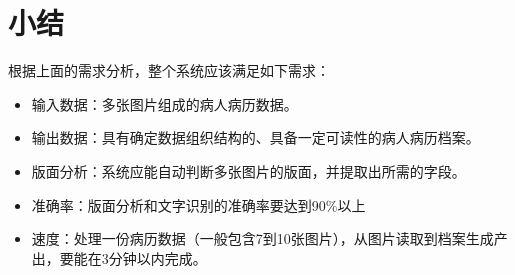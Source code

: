 \section{小结}
根据上面的需求分析，整个系统应该满足如下需求：
\begin{itemize}
	\item 输入数据：多张图片组成的病人病历数据。
	\item 输出数据：具有确定数据组织结构的、具备一定可读性的病人病历档案。
	\item 版面分析：系统应能自动判断多张图片的版面，并提取出所需的字段。
	\item 准确率：版面分析和文字识别的准确率要达到90\%以上
	\item 速度：处理一份病历数据（一般包含7到10张图片），从图片读取到档案生成产出，要能在3分钟以内完成。
\end{itemize}